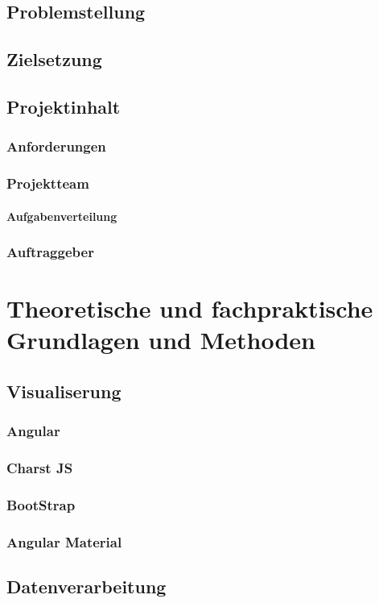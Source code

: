 \documentclass[pdftex,11pt,a4paper]{book}
\begin{document}
\section{Problemstellung}
\section{Zielsetzung}
\section{Projektinhalt}
\subsection{Anforderungen}
\subsection{Projektteam}
\subsubsection{Aufgabenverteilung}
\subsection{Auftraggeber}

\chapter{Theoretische und fachpraktische Grundlagen und Methoden}
\section{Visualiserung}
\subsection{Angular}
\subsection{Charst JS}
\subsection{BootStrap}
\subsection{Angular Material}
\section{Datenverarbeitung}
\end{document}

